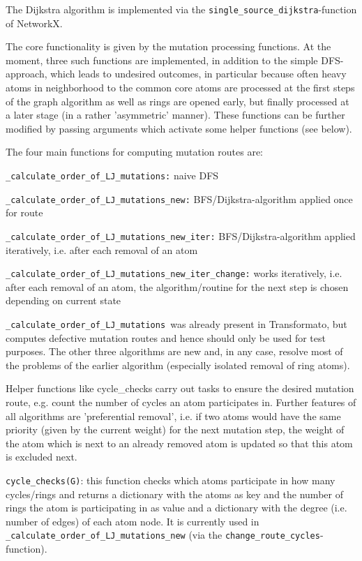 The Dijkstra algorithm is implemented via the \texttt{single\_source\_dijkstra}-function
of NetworkX.

The core functionality is given by the mutation processing functions.
At the moment, three such functions are implemented, in addition to
the simple DFS-approach, which leads to undesired outcomes, in particular because often heavy atoms in neighborhood to the common core atoms are processed at the first steps of the graph algorithm as well as rings are opened early, but finally processed at a later stage (in a rather 'asymmetric' manner). These functions
can be further modified by passing arguments which activate some helper
functions (see below).

The four main functions for computing mutation routes are: 

\texttt{\_calculate\_order\_of\_LJ\_mutations:} naive DFS 

\texttt{\_calculate\_order\_of\_LJ\_mutations\_new:} BFS/Dijkstra-algorithm
applied once for route

\texttt{\_calculate\_order\_of\_LJ\_mutations\_new\_iter:} BFS/Dijkstra-algorithm
applied iteratively, i.e. after each removal of an atom 

\texttt{\_calculate\_order\_of\_LJ\_mutations\_new\_iter\_change:}
works iteratively, i.e. after each removal of an atom, the algorithm/routine for the next step is chosen depending on current state

\texttt{\_calculate\_order\_of\_LJ\_mutations }was already present in Transformato, but computes defective mutation routes and hence
should only be used for test purposes. The other three algorithms
are new and, in any case, resolve most of the problems of the earlier
algorithm (especially isolated removal of ring atoms).

Helper functions like cycle\_checks carry out tasks to ensure the
desired mutation route, e.g. count the number of cycles an atom participates
in. Further features of all algorithms are 'preferential removal',
i.e. if two atoms would have the same priority (given by the current
weight) for the next mutation step, the weight of the atom which is
next to an already removed atom is updated so that this atom is excluded
next.

\texttt{cycle\_checks(G)}: this function checks which atoms participate
in how many cycles/rings and returns a dictionary with the atoms as
key and the number of rings the atom is participating in as value
and a dictionary with the degree (i.e. number of edges) of each atom
node. It is currently used in \texttt{\_calculate\_order\_of\_LJ\_mutations\_new}
(via the \texttt{change\_route\_cycles}-function).

